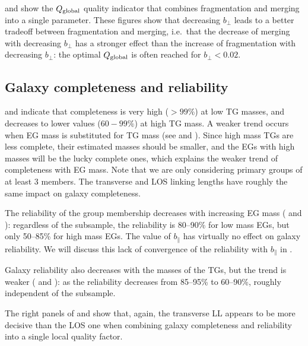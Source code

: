  and  show the
$Q_{\rm global}$ quality indicator that combines fragmentation and merging into
a single parameter. These figures show that decreasing $b_\perp$ leads to a
better tradeoff between fragmentation and merging, i.e.\ that the decrease of
merging with decreasing $b_\perp$ has a stronger effect than the increase of
fragmentation with decreasing $b_\perp$: the optimal $Q_{\rm global}$ is often
reached for $b_\perp < 0.02$.

\subsection{Galaxy completeness and reliability}

 and  indicate that
completeness is very high ($>99\%$) at low TG masses, and decreases to lower
values ($60-99\%$) at high TG mass. A weaker trend occurs when EG mass is
substituted for TG mass (see  and
). Since high mass TGs are less complete,
their estimated masses should be smaller, and the EGs with high masses will be
the lucky complete ones, which explains the weaker trend of completeness with
EG mass. Note that we are only considering primary groups of at least 3
members. The transverse and LOS linking lengths have roughly the same impact on
galaxy completeness.

The reliability of the group membership decreases with increasing EG mass
( and ):
regardless of the subsample, the reliability is 80--90\% for low mass EGs, but
only 50--85\% for high mass EGs. The value of $b_\parallel$ has virtually no
effect on galaxy reliability. We will discuss this lack of convergence of the
reliability with $b_\parallel$ in .

Galaxy reliability also decreases with the masses of the TGs, but the trend is
weaker ( and ): as
the reliability decreases from 85--95\% to 60--90\%, roughly independent of the
subsample.

The right panels of  and
 show that, again, the transverse LL appears
to be more decisive than the LOS one when combining galaxy completeness and
reliability into a single local quality factor.


